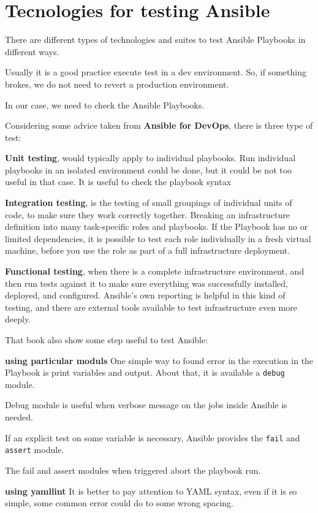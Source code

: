 \documentclass[12pt,a4paper,openright,twoside]{book}
\begin{document}
\section{Tecnologies for testing Ansible}
There are different types of technologies and suites to test Ansible Playbooks in different ways.


Usually it is a good practice execute test in a dev environment. So, if something brokes, we do not need to revert  a production environment.


In our case, we need to check the Ansible Playbooks.

Considering some advice taken from \textbf{Ansible for DevOps}\cite{ansibleForDevOps}, there is three type of test:


\textbf{Unit testing}, would typically apply to individual playbooks.
Run individual playbooks in an isolated environment could be done, but it could be not too useful in that case. It is useful to check the playbook syntax

\textbf{Integration testing}, is the testing of small groupings of individual units of code, to make sure they work correctly together.
Breaking an infrastructure definition into many task-specific roles and playbooks. If the Playbook has no or limited dependencies, it is possible to test each role individually in a fresh virtual machine, before you use the role as part of a full infrastructure deployment.

\textbf{Functional testing}, when there is a complete infrastructure environment, and then run tests against it to make sure everything was successfully installed, deployed, and configured. Ansible’s own reporting is helpful in this kind of testing, and there are external tools available to test infrastructure even more deeply.

That book also show some step useful to test Ansible:

\textbf{using particular moduls}
One simple way to found error in the execution in the Playbook is print variables and output. About that, it is available a \texttt{debug} module.


Debug module is useful when verbose message on the jobs inside Ansible is needed.


If an explicit test on some variable is necessary, Ansible provides the \texttt{fail} and \texttt{assert} module.


The fail and assert modules when triggered abort the playbook run.

\textbf{using yamllint}
It is better to pay attention to YAML syntax, even if it is so simple, some common error could do to some wrong spacing.
\end{document}
